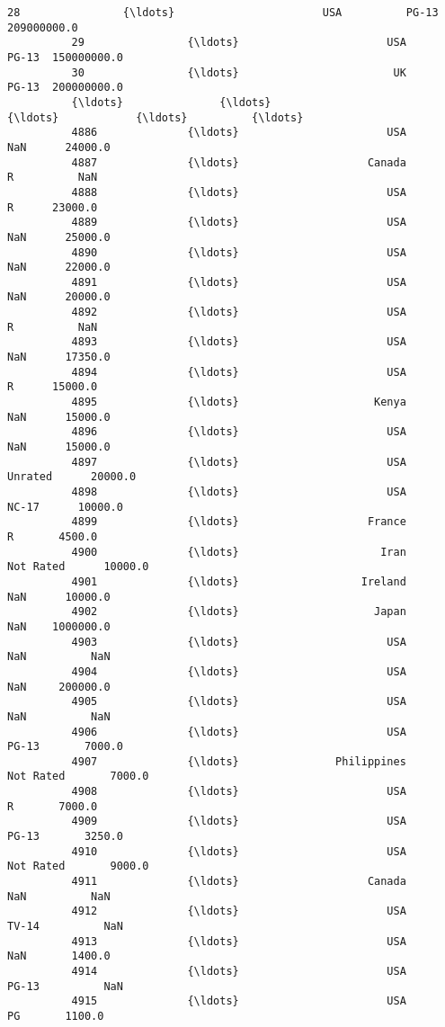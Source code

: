 \documentclass[11pt]{article}
\begin{document}
\begin{Verbatim}[commandchars=\\\{\}]
          28                {\ldots}                       USA          PG-13  209000000.0   
          29                {\ldots}                       USA          PG-13  150000000.0   
          30                {\ldots}                        UK          PG-13  200000000.0   
          {\ldots}               {\ldots}                       {\ldots}            {\ldots}          {\ldots}   
          4886              {\ldots}                       USA            NaN      24000.0   
          4887              {\ldots}                    Canada              R          NaN   
          4888              {\ldots}                       USA              R      23000.0   
          4889              {\ldots}                       USA            NaN      25000.0   
          4890              {\ldots}                       USA            NaN      22000.0   
          4891              {\ldots}                       USA            NaN      20000.0   
          4892              {\ldots}                       USA              R          NaN   
          4893              {\ldots}                       USA            NaN      17350.0   
          4894              {\ldots}                       USA              R      15000.0   
          4895              {\ldots}                     Kenya            NaN      15000.0   
          4896              {\ldots}                       USA            NaN      15000.0   
          4897              {\ldots}                       USA        Unrated      20000.0   
          4898              {\ldots}                       USA          NC-17      10000.0   
          4899              {\ldots}                    France              R       4500.0   
          4900              {\ldots}                      Iran      Not Rated      10000.0   
          4901              {\ldots}                   Ireland            NaN      10000.0   
          4902              {\ldots}                     Japan            NaN    1000000.0   
          4903              {\ldots}                       USA            NaN          NaN   
          4904              {\ldots}                       USA            NaN     200000.0   
          4905              {\ldots}                       USA            NaN          NaN   
          4906              {\ldots}                       USA          PG-13       7000.0   
          4907              {\ldots}               Philippines      Not Rated       7000.0   
          4908              {\ldots}                       USA              R       7000.0   
          4909              {\ldots}                       USA          PG-13       3250.0   
          4910              {\ldots}                       USA      Not Rated       9000.0   
          4911              {\ldots}                    Canada            NaN          NaN   
          4912              {\ldots}                       USA          TV-14          NaN   
          4913              {\ldots}                       USA            NaN       1400.0   
          4914              {\ldots}                       USA          PG-13          NaN   
          4915              {\ldots}                       USA             PG       1100.0   
          

\end{Verbatim}
\end{document}
